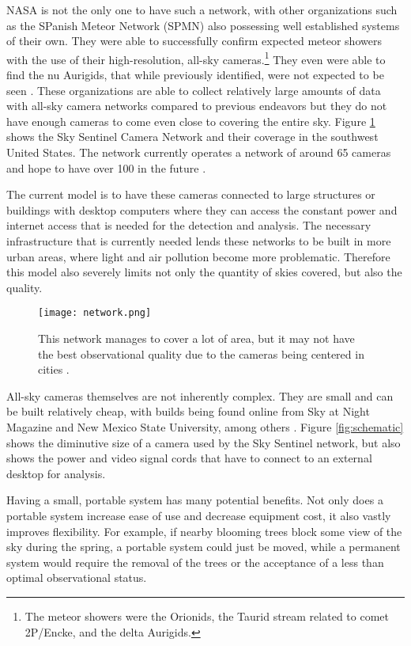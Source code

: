 NASA is not the only one to have such a network, with other organizations such as the SPanish Meteor Network (SPMN) also possessing well established systems of their own. They were  able to successfully confirm expected meteor showers with the use of their high-resolution, all-sky cameras.\footnote{The meteor showers were the Orionids, the Taurid stream related to comet 2P/Encke, and the delta Aurigids.} They even were able to find the nu Aurigids, that while previously identified, were not expected to be seen \cite{Trigo-Rodriguez2007}. These organizations are able to collect relatively large amounts of data with all-sky camera networks compared to previous endeavors but they do not have enough cameras to come even close to covering the entire sky. Figure \ref{fig:network} shows the Sky Sentinel Camera Network and their coverage in the southwest United States. The network currently operates a network of around 65 cameras and hope to have over 100 in the future \cite{Bannister2012}.

The current model is to have these cameras connected to large structures or buildings with desktop computers where they can access the constant power and internet access that is needed for the detection and analysis. The necessary infrastructure that is currently needed lends these networks to be built in more urban areas, where light and air pollution become more problematic. Therefore this  model also severely limits not only the quantity of skies covered, but also the quality.

\begin{figure}[ht!]
	\centering
	\texttt{[image: network.png]}
	\caption{This network manages to cover a lot of area, but it may not have the best observational quality due to the cameras being centered in cities \protect\cite{SkySentinel}.}
	\label{fig:network}
\end{figure}

All-sky cameras themselves are not inherently complex. They are small and can be built relatively cheap, with builds being found online from Sky at Night Magazine and New Mexico State University, among others \cite{Bannister2012}. Figure \ref{fig:schematic} shows the diminutive size of a camera used by the Sky Sentinel network, but also shows the power and video signal cords that have to connect to an external desktop for analysis. 

Having a small, portable system has many potential benefits. Not only does a portable system increase ease of use and decrease equipment cost, it also vastly improves flexibility. For example, if nearby blooming trees block some view of the sky during the spring, a portable system could just be moved, while a permanent system would require the removal of the trees or the acceptance of a less than optimal observational status.

